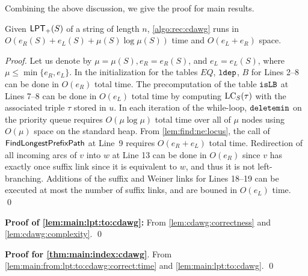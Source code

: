 Combining the above discussion, we give the proof for main results. 


\begin{lemmarep}\label{lem:cdawg:complexity}
  Given $\mathsf{LPT}_{+}(S)$ of a string of length $n$, 
  \cref{algo:rec:cdawg} runs in $O(e_R(S) + e_L(S) + \mu(S)\log \mu(S))$ time and $O(e_L + e_R)$ space. 
\end{lemmarep}

\begin{proof}
Let us denote by $\mu = \mu(S), e_R = e_R(S)$, and $e_L = e_L(S)$, where $\mu \le \min\{e_R, e_L\}$.
In the initialization for the tables $EQ$, $\mathtt{ldep}$, $B$ for Lines 2--8 can be done in $O(e_R)$ total time. The precomputation of the table $\mathtt{isLB}$ at Lines 7--8 can be done in $O(e_L)$ total time by computing $\mathrm{LC}_{S}(\tau)$ with the associated triple $\tau$ stored in $u$. 
In each iteration of the while-loop, $\mathtt{deletemin}$ on the priority queue requires $O(\mu \log \mu)$ total time over all of $\mu$ nodes using $O(\mu)$ space on the standard heap.
From \cref{lem:find:ne:locus}, the call of $\textsf{FindLongestPrefixPath}$ at Line~9 requires $O(e_R + e_L)$ total time. Redirection of all incoming arcs of $v$ into $w$ at Line 13 can be done in $O(e_R)$ since $v$ has exactly once suffix link since it is equivalent to $w$, and thus it is not left-branching.
Additions of the suffix and Weiner links for Lines 18--19 can be executed at most the number of suffix links, and are bouned in $O(e_L)$ time.
\qed\end{proof}

\begin{trivlist}\item[]
  \textbf{Proof of \cref{lem:main:lpt:to:cdawg}:}
  From \cref{lem:cdawg:correctness} and \cref{lem:cdawg:complexity}. 
\qed   
\end{trivlist}

\begin{trivlist}\item[]
  \textbf{Proof for \cref{thm:main:index:cdawg}}.
  From 
  \cref{lem:main:from:lpt:to:cdawg:correct:time}
  and
  \cref{lem:main:lpt:to:cdawg}. 
\qed
\end{trivlist}




